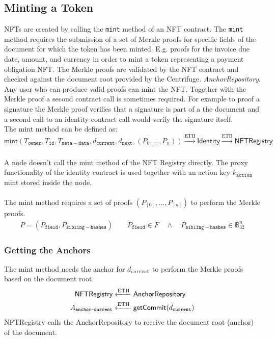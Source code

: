 \subsection{Minting a Token}
NFTs are created by calling the \texttt{mint} method of an NFT contract. The \texttt{mint} method requires the submission of a set of Merkle proofs for specific fields of the document for which the token has been minted. E.g. proofs for the invoice due date, amount, and currency in order to mint a token representing a payment obligation NFT. The Merkle proofs are validated by the NFT contract and checked against the document root provided by the Centrifuge.
\textit{AnchorRepository}. Any user who can produce valid proofs can mint the NFT. Together with the Merkle proof a second contract call is sometimes required. For example to proof a signature the Merkle proof verifies that a signature is part of a the document and a second call to an identity contract call would verify the signature itself.
\\The mint method can be defined as:\\
\begin{equation}
    \textsf{mint}(T_{\texttt{owner}}, T_{\texttt{id}},T_{\mathtt{meta-data}},d_{\mathtt{current}},d_{\mathtt{next}}, (P_{0},\dots, P_{n})) \xrightarrow[]{\text{ETH}} \mathsf{Identity} \xrightarrow[]{\text{ETH}}  \mathsf{NFTRegistry}
\end{equation}\\
A node doesn't call the mint method of the NFT Registry directly. The proxy functionality of the identity contract is used together with an action key $k_\mathtt{action}$ \textsf{mint} stored inside the node.\\\\
The mint method requires a set of proofs $(P_{[0]},...,P_{[n]})$ to perform the Merkle proofs.
\begin{equation}
\begin{split}
P = (P_{\mathtt{field}},P_{\mathtt{sibling-hashes}}) \qquad
P_{\mathtt{field}} \in F \quad \land \quad P_{\mathtt{sibling-hashes}} \in \mathbb{B}_{32}^n 
\end{split}
\end{equation}

\subsubsection{Getting the Anchors}
The mint method needs the anchor for $d_{\mathtt{current}}$ to perform the Merkle proofs based on the document root.
\begin{equation}
\begin{split}
\mathsf{NFTRegistry}   &\xleftarrow[]{\text{ETH}}  \mathsf{AnchorRepository} \\
A_{\texttt{anchor-current}} &\xleftarrow[]{\text{ETH}} \textsf{getCommit}(d_{\mathtt{current}})
\end{split}
\end{equation}
\textsf{NFTRegistry} calls the \textsf{AnchorRepository} to receive the document root (anchor) of the document. 


